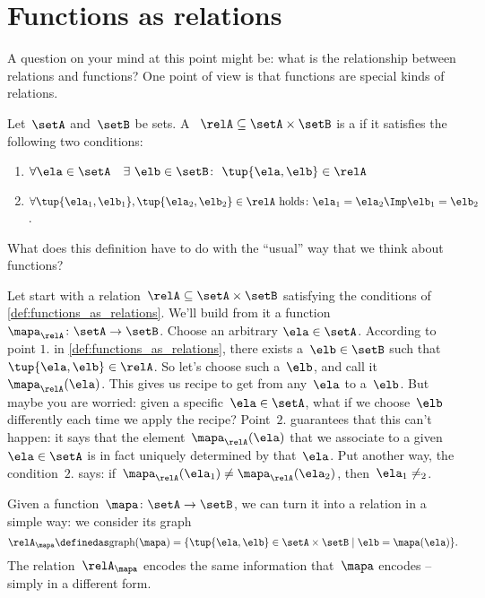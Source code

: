 

\section{Functions as relations}

A question on your mind at this point might be: what is the relationship between relations and functions? One point of view is that functions are special kinds of relations.

\begin{definition}
  \label{def:functions_as_relations}
  Let~$\setA$ and~$\setB$ be sets. A ~$\relA \subseteq \setA \times \setB$ is a \textbf{} if it satisfies the following two conditions:
  \begin{enumerate}
    \item $\forall \ela \in \setA \quad \exists \ \elb \in \setB\colon  \ \tup{\ela,\elb} \in \relA$
    \item $\forall \tup{\ela_1, \elb_1}, \tup{\ela_2, \elb_2} \in \relA  \text{ holds}\colon \ela_1 = \ela_2 \Imp \elb_1 = \elb_2$.
  \end{enumerate}
\end{definition}

What does this definition have to do with the ``usual'' way that we think about functions?

Let start with a relation~$\relA \subseteq \setA \times \setB$ satisfying the conditions of \cref{def:functions_as_relations}. We'll build from it a function~$\mapa_\relA \colon \setA \to \setB$. Choose an arbitrary $\ela \in \setA$. According to point $1.$ in \cref{def:functions_as_relations}, there exists a~$\elb \in \setB$ such that~$\tup{\ela,\elb} \in \relA$. So let's choose such a~$\elb$, and call it~$\mapa_\relA(\ela)$. This gives us recipe to get from any~$\ela$ to a~$\elb$. But maybe you are worried: given a specific~$\ela \in \setA$, what if we choose~$\elb$ differently each time we apply the recipe? Point~$2.$ guarantees that this can't happen: it says that the element~$\mapa_\relA(\ela)$ that we associate to a given~$\ela \in \setA$ is in fact uniquely determined by that~$\ela$. Put another way, the condition~$2.$ says: if~$\mapa_\relA(\ela_1) \neq \mapa_\relA(\ela_2)$, then~$\ela_1 \neq _2$.

Given a function~$\mapa \colon \setA \to \setB$, we can turn it into a relation in a simple way: we consider its graph
\begin{equation*}
  \relA_\mapa \definedas \text{graph}(\mapa) = \{ \tup{\ela,\elb} \in \setA \times \setB \mid \elb= \mapa(\ela) \}.
\end{equation*}
The relation~$\relA_\mapa$ encodes the same information that~$\mapa$ encodes -- simply in a different form.

